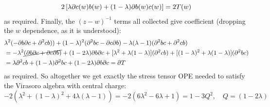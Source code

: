 \documentclass[11pt]{article}
\begin{document}
\begin{enumerate}
	\[
		2 \left[ \lambda \partial c(w) b(w) + (1 - \lambda) \partial b(w) c(w) \right] = 2 T(w)
	\]
	as required. Finally, the $(z-w)^{-1}$ terms all collected give coefficient (dropping the $w$ dependence, as it is understood):
	\[
	\begin{aligned}
		& \lambda^2 (-\partial b \partial c + \partial^2 c b)) + (1-\lambda)^2 (\partial^2 b c - \partial c \partial b) - \lambda (\lambda - 1) (\partial^2 b c + \partial^2 c b)\\
		&= - \lambda^2 \cancel{(\partial b \partial c + \partial c \partial b)} + (1 - 2 \lambda) \partial b \partial c  + [\lambda^2 + \lambda (1 -\lambda)] (\partial^2 c b) + [(1-\lambda)^2 + \lambda (1-\lambda)] (\partial^2 b c)\\
		&= \lambda \partial^2 c b + (1-\lambda) \partial^2 b c + (1 - 2 \lambda) \partial b \partial c = \partial T
	\end{aligned}
	\]
	as required. So altogether we get exactly the stress tensor OPE needed to satisfy the Virasoro algebra with central charge:
	\[
		-2 (\lambda^2 + (1-\lambda)^2 + 4 \lambda(\lambda-1)) = - 2 (6 \lambda^2 - 6 \lambda + 1) = 1 - 3 Q^2, \quad Q = (1-2\lambda)
	\]
	

\end{enumerate}
\end{document}
